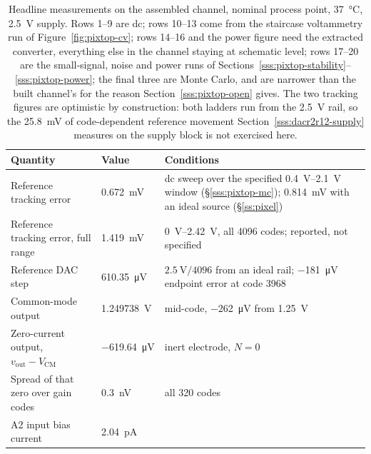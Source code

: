 \begin{table}[!htb]
  \centering
  \caption[{Headline measurements on the assembled channel.}]{Headline
  measurements on the assembled channel, nominal process point,
  \SI{37}{\celsius}, \SI{2.5}{\volt} supply. Rows 1--9 are dc; rows 10--13 come
  from the staircase voltammetry run of Figure~\ref{fig:pixtop-cv}; rows 14--16
  and the power figure need the extracted converter, everything else in the
  channel staying at schematic level; rows 17--20 are the small-signal,
  noise and power runs of
  Sections~\ref{sss:pixtop-stability}--\ref{sss:pixtop-power}; the final three
  are Monte Carlo, and are narrower than the built channel's for the reason
  Section~\ref{sss:pixtop-open} gives. The two tracking
  figures are optimistic by construction: both ladders run from the
  \SI{2.5}{\volt} rail, so the \SI{25.8}{\milli\volt} of code-dependent
  reference movement Section~\ref{sss:dacr2r12-supply} measures on the supply
  block is not exercised here.}
  \label{tab:pixtop-summary}
  {\footnotesize
  \setlength{\tabcolsep}{5pt}
  \begin{tabular}{@{}%
    >{\raggedright\arraybackslash}p{}%
    >{\raggedleft\arraybackslash}p{}%
    >{\raggedright\arraybackslash}p{}@{}}
    \toprule
    Quantity & Value & Conditions \\
    \midrule
    Reference tracking error &
      \SI{0.672}{\milli\volt} &
      dc sweep over the specified \SIrange{0.4}{2.1}{\volt} window
      (\S\ref{sss:pixtop-mc}); \SI{0.814}{\milli\volt} with
      an ideal source (\S\ref{ss:pixel}) \\
    Reference tracking error, full range &
      \SI{1.419}{\milli\volt} &
      \SIrange{0}{2.42}{\volt}, all 4096 codes; reported, not specified \\
    Reference DAC step &
      \SI{610.35}{\micro\volt} &
      \(\SI{2.5}{\volt}/4096\) from an ideal rail; \SI{-181}{\micro\volt}
      endpoint error at code 3968 \\
    Common-mode output &
      \SI{1.249738}{\volt} &
      mid-code, \SI{-262}{\micro\volt} from \SI{1.25}{\volt} \\
    \addlinespace
    Zero-current output, \(v_{\mathrm{out}} - V_{\mathrm{CM}}\) &
      \SI{-619.64}{\micro\volt} &
      inert electrode, \(N = 0\) \\
    Spread of that zero over gain codes &
      \SI{0.3}{\nano\volt} &
      all 320 codes \\
    A2 input bias current &
      \SI{2.04}{\pico\ampere} &

\end{tabular}}
\end{table}
